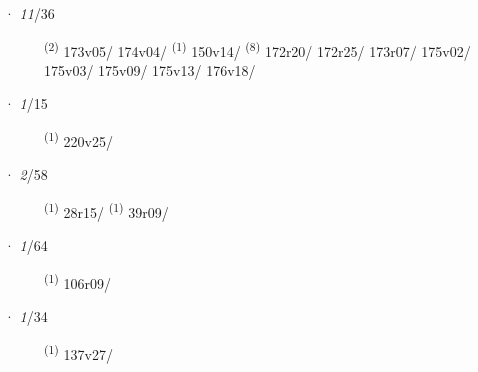 \ENTRYEND
\noindent{} · \textit{11}/36 \LEMMALINE
\begin{description}
    \item[]  \textsuperscript{(2)} \mbox{173v05/} \mbox{174v04/} \CASEBREAK {} \textsuperscript{(1)} \mbox{150v14/} \textsuperscript{(8)} \mbox{172r20/} \mbox{172r25/} \mbox{173r07/} \mbox{175v02/} \mbox{175v03/} \mbox{175v09/} \mbox{175v13/} \mbox{176v18/}
\end{description}
\ENTRYEND
\noindent{} · \textit{1}/15 \LEMMALINE
\begin{description}
    \item[]  \textsuperscript{(1)} \mbox{220v25/}
\end{description}
\ENTRYEND
\noindent{} · \textit{2}/58 \LEMMALINE
\begin{description}
    \item[]  \textsuperscript{(1)} \mbox{28r15/} \textsuperscript{(1)} \mbox{39r09/}
\end{description}
\ENTRYEND
\noindent{} · \textit{1}/64 \LEMMALINE
\begin{description}
    \item[]  \textsuperscript{(1)} \mbox{106r09/}
\end{description}
\ENTRYEND
\noindent{} · \textit{1}/34 \LEMMALINE
\begin{description}
    \item[]  \textsuperscript{(1)} \mbox{137v27/}
\end{description}
